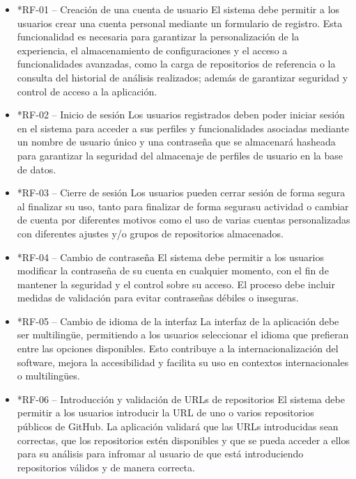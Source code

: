 \begin{itemize}

    \item *{RF-01 – Creación de una cuenta de usuario}
    El sistema debe permitir a los usuarios crear una cuenta personal mediante un formulario de registro. Esta funcionalidad es necesaria para garantizar la personalización de la experiencia, el almacenamiento de configuraciones y el acceso a funcionalidades avanzadas, como la carga de repositorios de referencia o la consulta del historial de análisis realizados; además de garantizar seguridad y control de acceso a la aplicación.
    
    \item*{RF-02 – Inicio  de sesión}
    Los usuarios registrados deben poder iniciar sesión en el sistema para acceder a sus perfiles y funcionalidades asociadas mediante un nombre de usuario único y una contraseña que se almacenará hasheada para garantizar la seguridad del almacenaje de perfiles de usuario en la base de datos.
    
    \item*{RF-03 – Cierre de sesión}
    Los usuarios pueden cerrar sesión de forma segura al finalizar su uso, tanto para finalizar de forma segurasu actividad o cambiar de cuenta por diferentes motivos como el uso de varias cuentas personalizadas con diferentes ajustes y/o grupos de repositorios almacenados.
    
    \item*{RF-04 – Cambio de contraseña}
    El sistema debe permitir a los usuarios modificar la contraseña de su cuenta en cualquier momento, con el fin de mantener la seguridad y el control sobre su acceso. El proceso debe incluir medidas de validación para evitar contraseñas débiles o inseguras.
    
    \item*{RF-05 – Cambio de idioma de la interfaz}
    La interfaz de la aplicación debe ser multilingüe, permitiendo a los usuarios seleccionar el idioma que prefieran entre las opciones disponibles. Esto contribuye a la internacionalización del software, mejora la accesibilidad y facilita su uso en contextos internacionales o multilingües.
    
    \item*{RF-06 – Introducción y validación de URLs de repositorios}
    El sistema debe permitir a los usuarios introducir la URL de uno o varios repositorios públicos de GitHub. La aplicación validará que las URLs introducidas sean correctas, que los repositorios estén disponibles y que se pueda acceder a ellos para su análisis para infromar al usuario de que está introduciendo repositorios válidos y de manera correcta.
    

\end{itemize}
